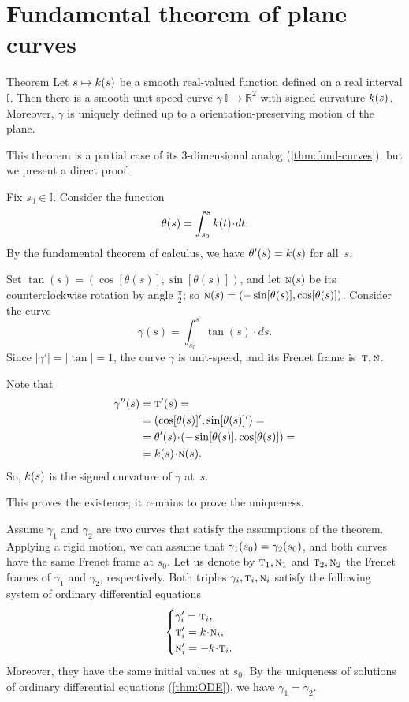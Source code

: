 \section{Fundamental theorem of plane curves}

\begin{thm}{Theorem}\label{thm:fund-curves-2D}
Let $s\mapsto k(s)$ be a smooth real-valued function defined on a real interval $\mathbb{I}$.
Then there is a smooth unit-speed curve $\gamma\:\mathbb{I}\to\mathbb{R}^2$ with signed curvature $k(s)$.
Moreover, $\gamma$ is uniquely defined up to a orientation-preserving motion of the plane.
\end{thm}

This theorem is a partial case of its 3-dimensional analog (\ref{thm:fund-curves}), but we present a direct proof.

Fix $s_0\in\mathbb{I}$.
Consider the function
\[\theta(s)
=
\int_{s_0}^s\skur(t)\cdot dt.\]
By the fundamental theorem of calculus, we have $\theta'(s)\z=\skur(s)$ for all~$s$.

Set 
$\tan(s)=(\cos[\theta(s)],\sin[\theta(s)])$,
and let $\text{\sc{n}}(s)$ be its counterclockwise rotation by angle $\tfrac\pi2$; so 
$\text{\sc{n}}(s)=(-\sin[\theta(s)],\cos[\theta(s)])$.
Consider the curve 
\[\gamma(s)=\int_{s_0}^s\tan(s)\cdot ds.\]
Since $|\gamma'|=|\tan|=1$, the curve $\gamma$ is unit-speed, and its Frenet frame is~$\text{\sc{t}},\text{\sc{n}}$. 

Note that
\begin{align*}
\gamma''(s)&=\tan'(s)=
\\
&=(\cos[\theta(s)]',\sin[\theta(s)]')=
\\
&=\theta'(s)\cdot (-\sin[\theta(s)],\cos[\theta(s)])=
\\
&=\skur(s)\cdot \norm(s).
\end{align*}
So, $k(s)$ is the signed curvature of $\gamma$ at~$s$. 

This proves the existence;
it remains to prove the uniqueness.

Assume $\gamma_1$ and $\gamma_2$ are two curves that satisfy the assumptions of the theorem.
Applying a rigid motion, we can assume that $\gamma_1(s_0)\z=\gamma_2(s_0)$, and both curves have the same Frenet frame at $s_0$.
Let us denote by $\text{\sc{t}}_1,\text{\sc{n}}_1$ and $\text{\sc{t}}_2,\text{\sc{n}}_2$ the Frenet frames of $\gamma_1$ and $\gamma_2$, respectively.
Both triples $\gamma_i,\text{\sc{t}}_i,\text{\sc{n}}_i$ satisfy the following system of ordinary differential equations 
\[
\begin{cases}
\gamma_i'=\tan_i,
\\
\tan_i'=\skur\cdot\norm_i,
\\
\norm_i'=-\skur\cdot\tan_i.
\end{cases}
\]
Moreover, they have the same initial values at $s_0$.
By the uniqueness of solutions of ordinary differential equations (\ref{thm:ODE}), we have $\gamma_1=\gamma_2$.
\qeds

